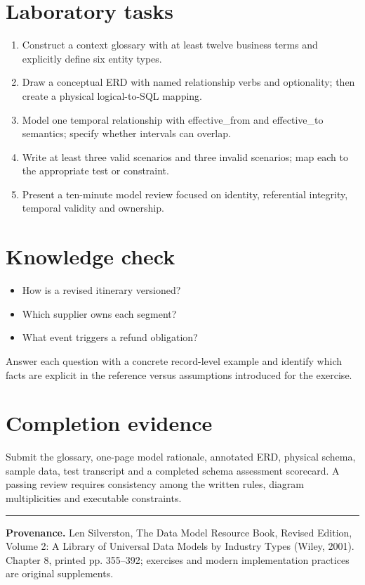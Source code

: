 \documentclass[11pt,letterpaper]{article}
\begin{document}
\section{Laboratory tasks}
\begin{enumerate}
\item Construct a context glossary with at least twelve business terms and explicitly define six entity types.
\item Draw a conceptual ERD with named relationship verbs and optionality; then create a physical logical-to-SQL mapping.
\item Model one temporal relationship with effective\_from and effective\_to semantics; specify whether intervals can overlap.
\item Write at least three valid scenarios and three invalid scenarios; map each to the appropriate test or constraint.
\item Present a ten-minute model review focused on identity, referential integrity, temporal validity and ownership.
\end{enumerate}

\section{Knowledge check}
\begin{itemize}
\item How is a revised itinerary versioned?
\item Which supplier owns each segment?
\item What event triggers a refund obligation?
\end{itemize}
Answer each question with a concrete record-level example and identify which facts are explicit in the reference versus assumptions introduced for the exercise.


\section{Completion evidence}
Submit the glossary, one-page model rationale, annotated ERD, physical schema, sample data, test transcript and a completed schema assessment scorecard. A passing review requires consistency among the written rules, diagram multiplicities and executable constraints.


\vfill
\hrule
{\footnotesize\textbf{Provenance.} Len Silverston, The Data Model Resource Book, Revised Edition, Volume 2: A Library of Universal Data Models by Industry Types (Wiley, 2001). Chapter 8, printed pp. 355--392; exercises and modern implementation practices are original supplements.}
\end{document}
